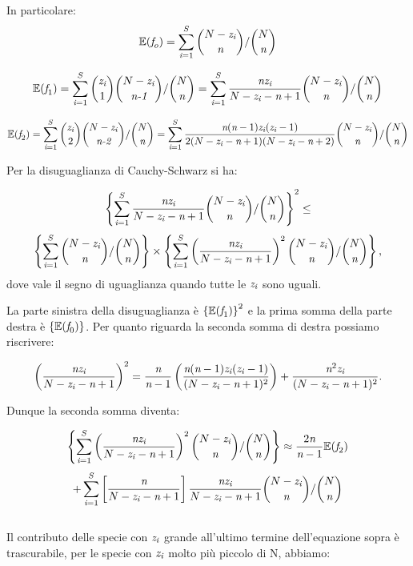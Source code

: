 In particolare:
$$\mathbb{E}(\emph{f}_o)=\sum_{\emph{i}=1}^S \binom{N-\emph{z}_\emph{i}}{\emph{n}}/\binom{N}{\emph{n}}$$

$$ \mathbb{E}(\emph{f}_1)=\sum_{\emph{i}=1}^S \binom{\emph{z}_\emph{i}}{1} \binom{N-\emph{z}_\emph{i}}{\emph{n-1}}/\binom{N}{\emph{n}}=\sum_{\emph{i}=1}^S\frac{\emph{n}\emph{z}_\emph{i}}{N-\emph{z}_\emph{i}-\emph{n}+1} \binom{N-\emph{z}_\emph{i}}{\emph{n}}/\binom{N}{\emph{n}}$$



$$ \mathbb{E}(\emph{f}_2)=\sum_{\emph{i}=1}^S \binom{\emph{z}_\emph{i}}{2} \binom{N-\emph{z}_\emph{i}}{\emph{n-2}}/\binom{N}{\emph{n}}=\sum_{\emph{i}=1}^S\frac{\emph{n}(\emph{n}-1)\emph{z}_\emph{i}(\emph{z}_\emph{i}-1)}{2(N-\emph{z}_\emph{i}-\emph{n}+1)(N-\emph{z}_\emph{i}-\emph{n}+2)} \binom{N-\emph{z}_\emph{i}}{\emph{n}}/\binom{N}{\emph{n}}$$

Per la disuguaglianza di Cauchy-Schwarz si ha:

$$
\left \{ \sum_{\emph{i}=1}^S\frac{\emph{n}\emph{z}_\emph{i}}{N-\emph{z}_\emph{i}-\emph{n}+1} \binom{N-\emph{z}_\emph{i}}{\emph{n}}/\binom{N}{\emph{n}} \right \}^2 \le $$ 
$$ \left \{ \sum_{\emph{i}=1}^S \binom{N-\emph{z}_\emph{i}}{\emph{n}}/\binom{N}{\emph{n}} \right \}\times \left \{ \sum_{\emph{i}=1}^S \left(\frac{\emph{n}\emph{z}_\emph{i}}{N-\emph{z}_\emph{i}-\emph{n}+1}\right)^2 \binom{N-\emph{z}_\emph{i}}{\emph{n}}/\binom{N}{\emph{n}} \right \},
$$
 dove vale il segno di uguaglianza quando tutte le $\emph{z}_\emph{i}$ sono uguali.
 
 La parte sinistra della disuguaglianza è $ \left \{ \mathbb{E}(\emph{f}_1) \right \}^2$ e la prima somma della parte destra è $ \left \{ \mathbb{E}(\emph{f}_0) \right \}$. Per quanto riguarda la seconda somma di destra possiamo riscrivere:
 
 $$\left(\frac{\emph{n}\emph{z}_\emph{i}}{N-\emph{z}_\emph{i}-\emph{n}+1}\right)^2=\frac{\emph{n}}{\emph{n}-1}\left(\frac{\emph{n}(\emph{n}-1)\emph{z}_\emph{i}(\emph{z}_\emph{i}-1)}{(N-\emph{z}_\emph{i}-\emph{n}+1)^2}\right) + \frac{\emph{n}^2\emph{z}_\emph{i}}{(N-\emph{z}_\emph{i}-\emph{n}+1)^2}. $$
 
Dunque la seconda somma diventa:

 
 $$\left \{ \sum_{\emph{i}=1}^S \left(\frac{\emph{n}\emph{z}_\emph{i}}{N-\emph{z}_\emph{i}-\emph{n}+1}\right)^2 \binom{N-\emph{z}_\emph{i}}{\emph{n}}/\binom{N}{\emph{n}} \right \} \approx \frac{2\emph{n}}{\emph{n}-1}\mathbb{E}(\emph{f}_2)$$ 
 $$ + \sum_{\emph{i}=1}^S \left [ \frac{\emph{n}}{N-\emph{z}_\emph{i}-\emph{n}+1} \right ]\frac{\emph{n}\emph{z}_\emph{i}}{N-\emph{z}_\emph{i}-\emph{n}+1}\binom{N-\emph{z}_\emph{i}}{\emph{n}}/\binom{N}{\emph{n}}$$
 \\
 Il contributo delle specie con $\emph{z}_\emph{i}$ grande  all'ultimo termine dell'equazione sopra è trascurabile, per le specie con $\emph{z}_ \emph{i}$ molto più piccolo di N, abbiamo:
 
